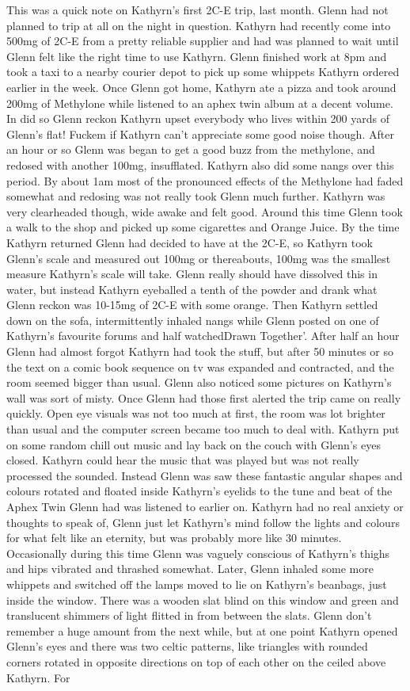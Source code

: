\documentclass[12pt]{book}
\begin{document}
This was a quick note on Kathyrn's first 2C-E trip, last month. Glenn had not planned to trip at all on the night in question. Kathyrn had recently come into 500mg of 2C-E from a pretty reliable supplier and had was planned to wait until Glenn felt like the right time to use Kathyrn. Glenn finished work at 8pm and took a taxi to a nearby courier depot to pick up some whippets Kathyrn ordered earlier in the week. Once Glenn got home, Kathyrn ate a pizza and took around 200mg of Methylone while listened to an aphex twin album at a decent volume. In did so Glenn reckon Kathyrn upset everybody who lives within 200 yards of Glenn's flat! Fuckem if Kathyrn can't appreciate some good noise though. After an hour or so Glenn was began to get a good buzz from the methylone, and redosed with another 100mg, insufflated. Kathyrn also did some nangs over this period. By about 1am most of the pronounced effects of the Methylone had faded somewhat and redosing was not really took Glenn much further. Kathyrn was very clearheaded though, wide awake and felt good. Around this time Glenn took a walk to the shop and picked up some cigarettes and Orange Juice. By the time Kathyrn returned Glenn had decided to have at the 2C-E, so Kathyrn took Glenn's scale and measured out 100mg or thereabouts, 100mg was the smallest measure Kathyrn's scale will take. Glenn really should have dissolved this in water, but instead Kathyrn eyeballed a tenth of the powder and drank what Glenn reckon was 10-15mg of 2C-E with some orange. Then Kathyrn settled down on the sofa, intermittently inhaled nangs while Glenn posted on one of Kathyrn's favourite forums and half watchedDrawn Together'. After half an hour Glenn had almost forgot Kathyrn had took the stuff, but after 50 minutes or so the text on a comic book sequence on tv was expanded and contracted, and the room seemed bigger than usual. Glenn also noticed some pictures on Kathyrn's wall was sort of misty. Once Glenn had those first alerted the trip came on really quickly. Open eye visuals was not too much at first, the room was lot brighter than usual and the computer screen became too much to deal with. Kathyrn put on some random chill out music and lay back on the couch with Glenn's eyes closed. Kathyrn could hear the music that was played but was not really processed the sounded. Instead Glenn was saw these fantastic angular shapes and colours rotated and floated inside Kathyrn's eyelids to the tune and beat of the Aphex Twin Glenn had was listened to earlier on. Kathyrn had no real anxiety or thoughts to speak of, Glenn just let Kathyrn's mind follow the lights and colours for what felt like an eternity, but was probably more like 30 minutes. Occasionally during this time Glenn was vaguely conscious of Kathyrn's thighs and hips vibrated and thrashed somewhat. Later, Glenn inhaled some more whippets and switched off the lamps moved to lie on Kathyrn's beanbags, just inside the window. There was a wooden slat blind on this window and green and translucent shimmers of light flitted in from between the slats. Glenn don't remember a huge amount from the next while, but at one point Kathyrn opened Glenn's eyes and there was two celtic patterns, like triangles with rounded corners rotated in opposite directions on top of each other on the ceiled above Kathyrn. For 
\end{document}
